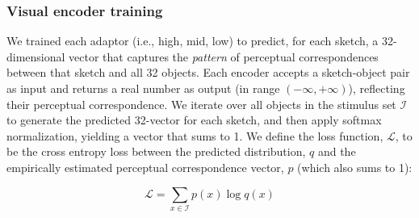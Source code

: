 \documentclass[9pt,twocolumn,twoside]{pnas-new}
\begin{document}
{%



\subsubsection*{Visual encoder training}

We trained each adaptor (i.e., high, mid, low) to predict, for each sketch, a 32-dimensional vector that captures the \textit{pattern} of perceptual correspondences between that sketch and all 32 objects. 
Each encoder accepts a sketch-object pair as input and returns a real number as output (in range $(-\infty, + \infty)$), reflecting their perceptual correspondence.
We iterate over all objects in the stimulus set $\mathcal{I}$ to generate the predicted 32-vector for each sketch, and then apply softmax normalization, yielding a vector that sums to 1. 
We define the loss function, $\mathcal{L}$, to be the cross entropy loss between the predicted distribution, $q$ and the empirically estimated perceptual correspondence vector, $p$ (which also sums to 1):

\begin{equation}
    \mathcal{L} = \sum_{x \in \mathcal{I}} p(x)\log q(x)
    \label{eqn:cross_entropy}
\end{equation}


}
\end{document}
